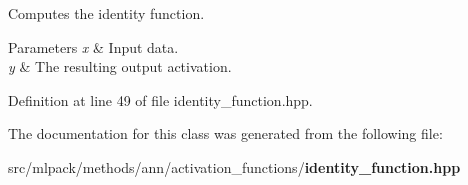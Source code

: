 Computes the identity function. 


\begin{DoxyParams}{Parameters}
{\em x} & Input data. \\
\hline
{\em y} & The resulting output activation. \\
\hline
\end{DoxyParams}


Definition at line 49 of file identity\+\_\+function.\+hpp.



The documentation for this class was generated from the following file\+:\begin{DoxyCompactItemize}
\item 
src/mlpack/methods/ann/activation\+\_\+functions/{\bf identity\+\_\+function.\+hpp}\end{DoxyCompactItemize}
